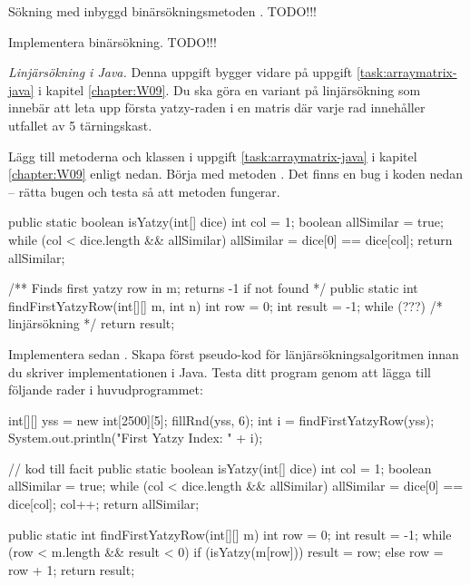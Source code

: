 \Subtask Sökning med inbyggd binärsökningsmetoden . TODO!!!

\Subtask Implementera binärsökning. TODO!!!



\Task \emph{Linjärsökning i Java.} Denna uppgift bygger vidare på uppgift \ref{task:arraymatrix-java} i kapitel \ref{chapter:W09}. Du ska göra en variant på linjärsökning som innebär att leta upp första yatzy-raden i en matris där varje rad innehåller utfallet av 5 tärningskast. 

\Subtask Lägg till metoderna  och  klassen  i uppgift \ref{task:arraymatrix-java} i kapitel \ref{chapter:W09} enligt nedan. Börja med metoden  . Det finns en bug i koden nedan -- rätta bugen och testa så att metoden fungerar. 

\begin{Code}[language=Java]
    public static boolean isYatzy(int[] dice){
        int col = 1;
        boolean allSimilar = true;
        while (col < dice.length && allSimilar) {
          allSimilar = dice[0] == dice[col];
        }
        return allSimilar;
    }
    
    /** Finds first yatzy row in m; returns -1 if not found */
    public static int findFirstYatzyRow(int[][] m, int n){
        int row = 0;
        int result = -1;
        while (???) {
             /* linjärsökning  */ 
        }
        return result;
    }
\end{Code}

\Subtask Implementera sedan . Skapa först pseudo-kod för länjärsökningsalgoritmen innan du skriver implementationen i Java. 
Testa ditt program genom att lägga till följande rader i huvudprogrammet:
\begin{Code}[language=Java]
        int[][] yss = new int[2500][5];
        fillRnd(yss, 6);
        int i = findFirstYatzyRow(yss);
        System.out.println("First Yatzy Index: " + i);
\end{Code}




\begin{Code}[language=Java]
// kod till facit
    public static boolean isYatzy(int[] dice){
        int col = 1;
        boolean allSimilar = true;
        while (col < dice.length && allSimilar) {
          allSimilar = dice[0] == dice[col];
          col++;
        }
        return allSimilar;
    }
    
    public static int findFirstYatzyRow(int[][] m){
        int row = 0;
        int result = -1;
        while (row < m.length && result < 0){
            if (isYatzy(m[row])) {
              result = row;
            } else {
              row = row + 1;    
            }
        }
        return result;
    }
\end{Code}



